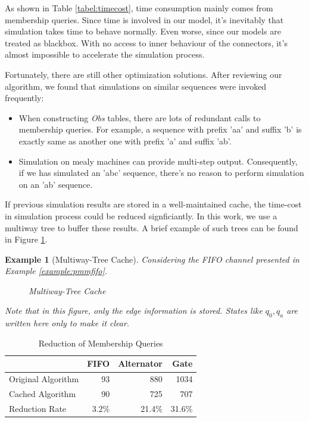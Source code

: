 \documentclass[conference, a4paper]{IEEEtran}
\newtheorem{example}{Example}
\begin{document}
As shown in Table \ref{tabel:timecost}, time consumption mainly comes from membership queries.
Since time is involved in our model, it's inevitably that simulation takes time to behave normally.
Even worse, since our models are treated as blackbox. With no access to inner behaviour of the
connectors, it's almost impossible to accelerate the simulation process.

Fortunately, there are still other optimization solutions. After reviewing our algorithm, we found
that simulations on similar sequences were invoked frequently:

\begin{itemize}
  \item When constructing \emph{Obs} tables, there are lots of redundant calls to membership
    queries. For example, a sequence with prefix 'aa' and suffix 'b' is exactly same as another one
    with prefix 'a' and suffix 'ab'.
  \item Simulation on mealy machines can provide multi-step output. Consequently, if we has
    simulated an 'abc' sequence, there's no reason to perform simulation on an 'ab' sequence.
\end{itemize}

If previous simulation results are stored in a well-maintained cache, the time-cost in
simulation process could be reduced signficiantly. In this work, we use a multiway tree to buffer
these results. A brief example of such trees can be found in Figure \ref{fig:multiway}.

\begin{example}[Multiway-Tree Cache]
  \label{example:tree}
  Considering the FIFO channel presented in Example \ref{example:pmmfifo}. 
  \begin{figure}[h]
    \begin{center}
      
    \end{center}
    \caption{Multiway-Tree Cache}
    \label{fig:multiway}
  \end{figure}
  Note that in this figure, only the edge information is stored. States like $q_0,q_a$ are written
  here only to make it clear.
\end{example}

\begin{table}[h]
  \renewcommand{\arraystretch}{1.3}
  \caption{Reduction of Membership Queries}
  \label{tabel:cacheoptimization}
  \centering
  \begin{tabular}{l||rrr}
    \hline
    & FIFO & Alternator & Gate \\
    \hline\hline
    Original Algorithm & 93 & 880 & 1034 \\
    Cached Algorithm & 90 & 725 & 707 \\
    Reduction Rate & 3.2\% & 21.4\% & 31.6\% \\
    \hline
  \end{tabular}
\end{table}
\end{document}
